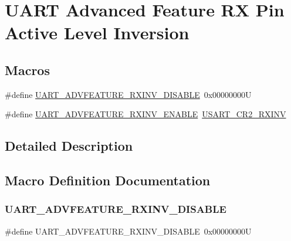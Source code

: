 \hypertarget{group___u_a_r_t___rx___inv}{}\section{U\+A\+RT Advanced Feature RX Pin Active Level Inversion}
\label{group___u_a_r_t___rx___inv}
\subsection*{Macros}
\begin{DoxyCompactItemize}
\item 
\#define \mbox{\hyperlink{group___u_a_r_t___rx___inv_gae9598a2e4fec4b9166ad5eab24027870}{U\+A\+R\+T\+\_\+\+A\+D\+V\+F\+E\+A\+T\+U\+R\+E\+\_\+\+R\+X\+I\+N\+V\+\_\+\+D\+I\+S\+A\+B\+LE}}~0x00000000U
\item 
\#define \mbox{\hyperlink{group___u_a_r_t___rx___inv_gae12343bc2373080ae518ce7b536205cb}{U\+A\+R\+T\+\_\+\+A\+D\+V\+F\+E\+A\+T\+U\+R\+E\+\_\+\+R\+X\+I\+N\+V\+\_\+\+E\+N\+A\+B\+LE}}~\mbox{\hyperlink{group___peripheral___registers___bits___definition_gafff10115e1adb07c00f42627cedf01e5}{U\+S\+A\+R\+T\+\_\+\+C\+R2\+\_\+\+R\+X\+I\+NV}}
\end{DoxyCompactItemize}


\subsection{Detailed Description}


\subsection{Macro Definition Documentation}
\mbox{\label{group___u_a_r_t___rx___inv_gae9598a2e4fec4b9166ad5eab24027870}} 
\subsubsection{\texorpdfstring{UART\_ADVFEATURE\_RXINV\_DISABLE}{UART\_ADVFEATURE\_RXINV\_DISABLE}}
{\footnotesize\ttfamily \#define U\+A\+R\+T\+\_\+\+A\+D\+V\+F\+E\+A\+T\+U\+R\+E\+\_\+\+R\+X\+I\+N\+V\+\_\+\+D\+I\+S\+A\+B\+LE~0x00000000U}

